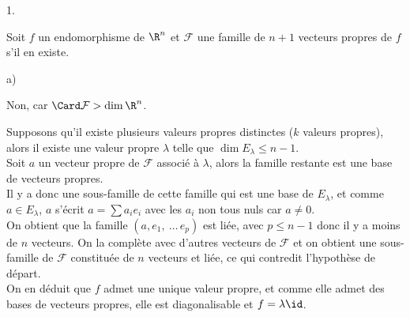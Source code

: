 \documentclass[11pt]{article}%
\begin{document}
\begin{exercice}
\begin{noliste}{1.}
 \item Soit $f$ un endomorphisme de $\R^{n}$ et $\mathcal{F}$ une
 famille de $n + 1$ vecteurs propres de $f$ s'il en existe.

 \begin{noliste}{a)}
 \setlength{\itemsep}{2mm}
 \item Non, car $\Card \mathcal{F} > \dim \R^{n}$. \\

 \item Supposons qu'il existe plusieurs valeurs propres distinctes ($k$
valeurs propres), alors il existe une valeur propre $\lambda$ telle que
$\dim E_{\lambda} \leq n-1$. \\
 Soit $a$ un vecteur propre de $\mathcal{F}$ associé à $\lambda$, alors
la famille restante est une base de vecteurs propres. \\
 Il y a donc une sous-famille de cette famille qui est une base de
$E_{\lambda}$, et comme $a \in E_{\lambda}$, $a$ s'écrit $a = \sum
a_{i} e_{i}$ avec les $a_{i}$ non tous nuls car $a \neq 0$. \\
 On obtient que la famille $(a, e_{1},\ \dots\, e_{p})$ est liée, avec
$p \leq n-1$ donc il y a moins de $n$ vecteurs. On la complète avec
d'autres vecteurs de $\mathcal{F}$ et on obtient une sous-famille de
$\mathcal{F}$ constituée de $n$ vecteurs et liée, ce qui contredit
l'hypothèse de départ. \\
 On en déduit que $f$ admet une unique valeur propre, et comme elle
admet des bases de vecteurs propres, elle est diagonalisable et $f =
\lambda \id$.
 \end{noliste}
 \end{noliste}

 \end{exercice}

 \newpage
\end{document}
